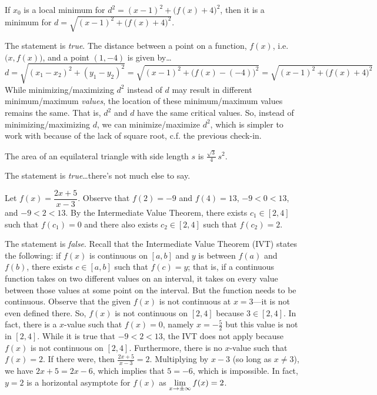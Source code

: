 \documentclass[11pt,letterpaper]{article}
\begin{document}
 If $x_0$ is a local minimum for $d^2= (x - 1)^2 + \big( f(x) + 4 \big)^2$, then it is a minimum for $d= \sqrt{(x - 1)^2 + \big( f(x) + 4 \big)^2}$. \pspace

\sol The statement is \textit{true}. The distance between a point on a function, $f(x)$, i.e. $\big(x, f(x) \big)$, and a point $(1, -4)$ is given by\dots
	\[
	d= \sqrt{(x_1 - x_2)^2 + (y_1 - y_2)^2}= \sqrt{(x - 1)^2 + \big(f(x) - (-4) \big)^2}= \sqrt{(x - 1)^2 + \big(f(x) + 4 \big)^2}
	\]
While minimizing/maximizing $d^2$ instead of $d$ may result in different minimum/maximum \textit{values}, the location of these minimum/maximum values remains the same. That is, $d^2$ and $d$ have the same critical values. So, instead of minimizing/maximizing $d$, we can minimize/maximize $d^2$, which is simpler to work with because of the lack of square root, c.f. the previous check-in. \pvspace{1.3cm}



 The area of an equilateral triangle with side length $s$ is $\frac{\sqrt{3}}{4}\, s^2$. \pspace

\sol The statement is \textit{true}\dots there's not much else to say. \pvspace{1.1cm}



 Let $f(x)= \dfrac{2x + 5}{x - 3}$. Observe that $f(2)= -9$ and $f(4)= 13$, $-9 < 0 < 13$, and $-9 < 2 < 13$. By the Intermediate Value Theorem, there exists $c_1 \in [2, 4]$ such that $f(c_1)= 0$ and there also exists $c_2 \in [2, 4]$ such that $f(c_2)= 2$. \pspace

\sol The statement is \textit{false}. Recall that the Intermediate Value Theorem (IVT) states the following: if $f(x)$ is continuous on $[a, b]$ and $y$ is between $f(a)$ and $f(b)$, there exists $c \in [a, b]$ such that $f(c)= y$; that is, if a continuous function takes on two different values on an interval, it takes on every value between those values at some point on the interval. But the function needs to be continuous. Observe that the given $f(x)$ is not continuous at $x= 3$---it is not even defined there. So, $f(x)$ is not continuous on $[2, 4]$ because $3 \in [2, 4]$. In fact, there is a $x$-value such that $f(x)= 0$, namely $x= -\frac{5}{2}$ but this value is not in $[2, 4]$. While it is true that $-9 < 2 < 13$, the IVT does not apply because $f(x)$ is not continuous on $[2, 4]$. Furthermore, there is no $x$-value such that $f(x)= 2$. If there were, then $\frac{2x + 5}{x - 3}= 2$. Multiplying by $x - 3$ (so long as $x \neq 3$), we have $2x + 5= 2x - 6$, which implies that $5= -6$, which is impossible. In fact, $y= 2$ is a horizontal asymptote for $f(x)$ as $\displaystyle\lim_{x \to \pm \infty} f(x)= 2$. \pvspace{0.8cm}
\end{document}
